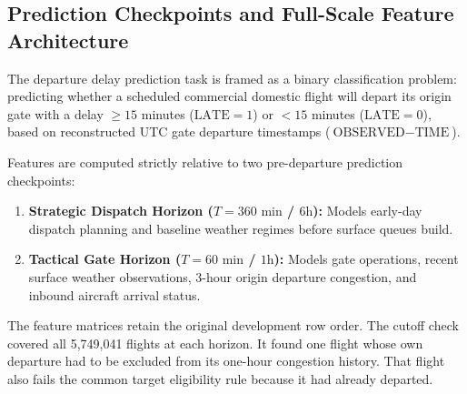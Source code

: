 
\subsection{Prediction Checkpoints and Full-Scale Feature Architecture}
The departure delay prediction task is framed as a binary classification problem: predicting whether a scheduled commercial domestic flight will depart its origin gate with a delay $\ge 15$ minutes ($\text{LATE} = 1$) or $< 15$ minutes ($\text{LATE} = 0$), based on reconstructed UTC gate departure timestamps ($\text{OBSERVED} - \text{TIME}$).

Features are computed strictly relative to two pre-departure prediction checkpoints:
\begin{enumerate}
    \item \textbf{Strategic Dispatch Horizon ($T = 360\text{ min}$ / $6\text{h}$):} Models early-day dispatch planning and baseline weather regimes before surface queues build.
    \item \textbf{Tactical Gate Horizon ($T = 60\text{ min}$ / $1\text{h}$):} Models gate operations, recent surface weather observations, 3-hour origin departure congestion, and inbound aircraft arrival status.
\end{enumerate}

The feature matrices retain the original development row order. The cutoff check covered all 5,749,041 flights at each horizon. It found one flight whose own departure had to be excluded from its one-hour congestion history. That flight also fails the common target eligibility rule because it had already departed.

